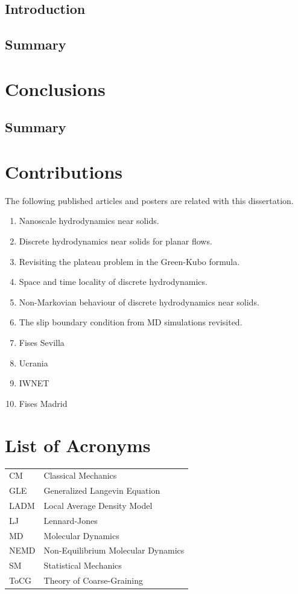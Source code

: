 \documentclass[a4paper,openright,12pt]{book}
\begin{document}
\section{Introduction}
\section{Summary}


\chapter{Conclusions}\label{cap.Conclusions}
\section{Summary}

\appendix
\chapter{Contributions}\label{Ap:Contributions}
The following published articles and posters are related with this dissertation.
\begin{enumerate}
  \item Nanoscale hydrodynamics near solids.
  \item Discrete hydrodynamics near solids for planar flows.
  \item Revisiting the plateau problem in the Green-Kubo formula.
  \item Space and time locality of discrete hydrodynamics.
  \item Non-Markovian behaviour of discrete hydrodynamics near solids.
  \item The slip boundary condition from MD simulations revisited.
  \item Fises Sevilla
  \item Ucrania
  \item IWNET
  \item Fises Madrid
\end{enumerate}


\chapter{List of Acronyms}\label{Ap:Acronyms}
\begin{tabular}{l l}
    CM & Classical Mechanics \\
    GLE & Generalized Langevin Equation \\
    LADM & Local Average Density Model \\
    LJ & Lennard-Jones \\
    MD & Molecular Dynamics \\
    NEMD & Non-Equilibrium Molecular Dynamics\\
    SM & Statistical Mechanics \\
    ToCG & Theory of Coarse-Graining \\
\end{tabular}
\end{document}
